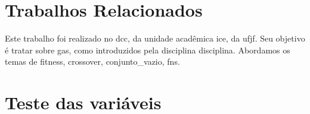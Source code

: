 \section{Trabalhos Relacionados}%
\label{sec:relacionados}


Este trabalho foi realizado no \gls{dcc}, da unidade acadêmica \gls{ice}, da \gls{ufjf}.
Seu objetivo é tratar sobre \glspl{ga}, como introduzidos pela disciplina \gls{disciplina}.
Abordamos os temas de \gls{fitness}, \gls{crossover}, \gls{conjunto_vazio}, \glspl{fn}.

\section{Teste das variáveis}%
\label{sec:teste_variaveis}

\testaVariaveis{}

\lipsum[1-20] %
